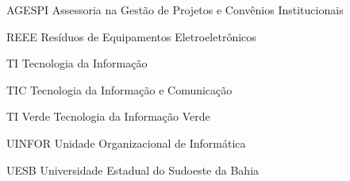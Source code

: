 \begin{siglas}
    \item[AGESPI] Assessoria na Gestão de Projetos e Convênios Institucionais
    \item[REEE] Resíduos de Equipamentos Eletroeletrônicos
    \item[TI] Tecnologia da Informação
    \item[TIC] Tecnologia da Informação e Comunicação
    \item[TI Verde] Tecnologia da Informação Verde
    \item[UINFOR] Unidade Organizacional de Informática
    \item[UESB] Universidade Estadual do Sudoeste da Bahia
\end{siglas}
